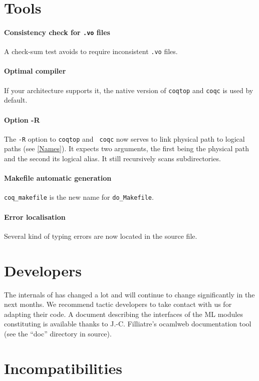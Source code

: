 \documentclass[11pt]{article}
\begin{document}
\section{Tools}
\label{Tools}

\paragraph{Consistency check for {\tt .vo} files} A check-sum test
avoids to require inconsistent {\tt .vo} files.

\paragraph{Optimal compiler} If your architecture supports it, the native
version of {\tt coqtop} and {\tt coqc} is used by default.

\paragraph{Option -R} The {\tt -R} option to {\tt coqtop} and {\tt
coqc} now serves to link physical path to logical paths (see
\ref{Names}). It expects two arguments, the first being the physical
path and the second its logical alias. It still recursively scans
subdirectories.

\paragraph{Makefile automatic generation} {\tt coq\_makefile} is the
new name for {\tt do\_Makefile}.

\paragraph{Error localisation} Several kind of typing errors are now
located in the source file.

\section{Developers}
\label{Developers}
The internals of {\Coq} has changed a lot and will continue to change
significantly in the next months. We recommend tactic developers to
take contact with us for adapting their code. A document describing
the interfaces of the ML modules constituting {\Coq} is available
thanks to J.-C. Filliatre's ocamlweb
documentation tool (see the ``doc'' directory in {\Coq} source).

\section{Incompatibilities}
\label{Incompatibilities}
\end{document}
